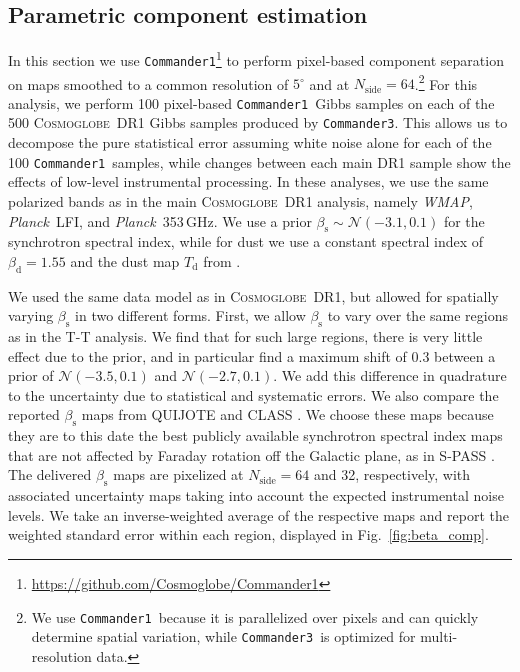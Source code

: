 \documentclass[twocolumn]{../../common/aa}
\def\WMAP{\emph{WMAP}}
\def\Planck{\emph{Planck}}
\def\commanderone{\texttt{Commander1}}
\def\commanderthree{\texttt{Commander3}}
\newcommand{\cosmoglobe}{\textsc{Cosmoglobe}}
\begin{document}


\subsection{Parametric component estimation}
\label{sec:comm1}

In this section we use \commanderone\footnote{\url{https://github.com/Cosmoglobe/Commander1}} to perform pixel-based component separation on maps smoothed to a common resolution of $5^\circ$ and at $N_\mathrm{side}=64$.\footnote{We use \commanderone\ because it is parallelized over pixels and can quickly determine spatial variation, while \commanderthree\ is optimized for multi-resolution data.}
For this analysis, we perform 100 pixel-based \commanderone\ Gibbs samples on each of the 500 \cosmoglobe\ DR1 Gibbs samples produced by \commanderthree. This allows us to decompose the pure statistical error assuming white noise alone for each of the 100 \commanderone\ samples, while changes between each main DR1 sample show the effects of low-level instrumental processing. In these analyses, we use the same polarized bands as in the main \cosmoglobe\ DR1 analysis, namely \WMAP, \Planck\ LFI, and \Planck\ 353\,GHz. We use a prior $\beta_\mathrm s\sim\mathcal N(-3.1, 0.1)$ for the synchrotron spectral index, while for dust we use a constant spectral index of $\beta_\mathrm d=1.55$ and the dust map $T_\mathrm d$ from \citet{planck2014-a12}.

We used the same data model as in \cosmoglobe\ DR1, but allowed for spatially varying $\beta_\mathrm s$ in two different forms.
First, we allow $\beta_\mathrm s$ to vary over the same regions as in the T-T analysis.
We find that for such large regions, there is very little effect due to the prior, and in particular find a maximum shift of 0.3 between a prior of $\mathcal N(-3.5,0.1)$ and $\mathcal N(-2.7, 0.1)$. We add this difference in quadrature to the uncertainty due to statistical and systematic errors. 
We also compare the reported $\beta_\mathrm s$ maps from QUIJOTE \citep{QUIJOTE_VIII} and CLASS \citep{eimer2023}. We choose these maps because they are to this date the best publicly available synchrotron spectral index maps that are not affected by Faraday rotation off the Galactic plane, as in S-PASS \citep{krachmalnicoff2018,fuskeland:2019}. The delivered $\beta_\mathrm s$ maps are pixelized at $N_\mathrm{side}=64$ and 32, respectively, with associated uncertainty maps taking into account the expected instrumental noise levels. We take an inverse-weighted average of the respective maps and report the weighted standard error within each region, displayed in Fig.~\ref{fig:beta_comp}. 
\end{document}
